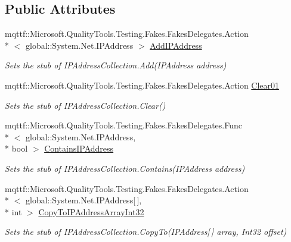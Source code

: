 \subsection*{Public Attributes}
\begin{DoxyCompactItemize}
\item 
mqttf\-::\-Microsoft.\-Quality\-Tools.\-Testing.\-Fakes.\-Fakes\-Delegates.\-Action\\*
$<$ global\-::\-System.\-Net.\-I\-P\-Address $>$ \hyperlink{class_system_1_1_net_1_1_network_information_1_1_fakes_1_1_stub_i_p_address_collection_abeb073cdd1b042feb09ba313d33436d4}{Add\-I\-P\-Address}
\begin{DoxyCompactList}\small\item\em Sets the stub of I\-P\-Address\-Collection.\-Add(\-I\-P\-Address address)\end{DoxyCompactList}\item 
mqttf\-::\-Microsoft.\-Quality\-Tools.\-Testing.\-Fakes.\-Fakes\-Delegates.\-Action \hyperlink{class_system_1_1_net_1_1_network_information_1_1_fakes_1_1_stub_i_p_address_collection_a65b05322e04c197c2618b4dceea58716}{Clear01}
\begin{DoxyCompactList}\small\item\em Sets the stub of I\-P\-Address\-Collection.\-Clear()\end{DoxyCompactList}\item 
mqttf\-::\-Microsoft.\-Quality\-Tools.\-Testing.\-Fakes.\-Fakes\-Delegates.\-Func\\*
$<$ global\-::\-System.\-Net.\-I\-P\-Address, \\*
bool $>$ \hyperlink{class_system_1_1_net_1_1_network_information_1_1_fakes_1_1_stub_i_p_address_collection_a4ec3e2b5ab82c0290cf2fceb6b1b5b1a}{Contains\-I\-P\-Address}
\begin{DoxyCompactList}\small\item\em Sets the stub of I\-P\-Address\-Collection.\-Contains(\-I\-P\-Address address)\end{DoxyCompactList}\item 
mqttf\-::\-Microsoft.\-Quality\-Tools.\-Testing.\-Fakes.\-Fakes\-Delegates.\-Action\\*
$<$ global\-::\-System.\-Net.\-I\-P\-Address\mbox{[}$\,$\mbox{]}, \\*
int $>$ \hyperlink{class_system_1_1_net_1_1_network_information_1_1_fakes_1_1_stub_i_p_address_collection_add5138194b020beb62b3b0c127946680}{Copy\-To\-I\-P\-Address\-Array\-Int32}
\begin{DoxyCompactList}\small\item\em Sets the stub of I\-P\-Address\-Collection.\-Copy\-To(\-I\-P\-Address\mbox{[}$\,$\mbox{]} array, Int32 offset)\end{DoxyCompactList}\item 

\end{DoxyCompactItemize}
